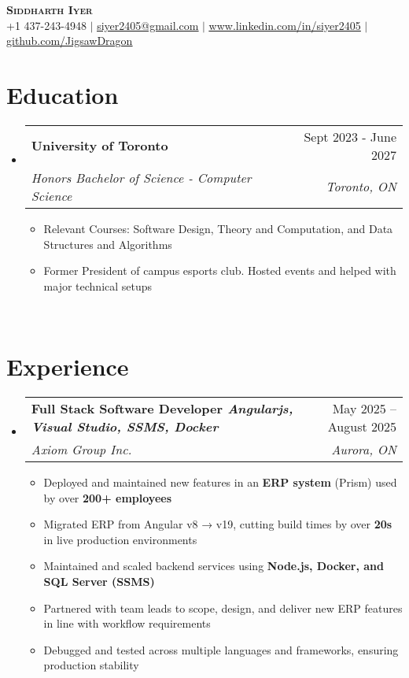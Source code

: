 \documentclass[letterpaper,11pt]{article}
\makeatletter
\newcommand{\resumeItem}[1]{
  \item\small{
    {#1 \vspace{-2pt}}
  }
}
\newcommand{\resumeSubheading}[4]{
  \vspace{-2pt}\item
    \begin{tabular*}{0.97\textwidth}[t]{l@{\extracolsep{\fill}}r}
      \textbf{#1} & #2 \\
      \textit{\small#3} & \textit{\small #4} \\
    \end{tabular*}\vspace{-7pt}
}
\newcommand{\resumeSubHeadingListStart}{\begin{itemize}[leftmargin=0.15in, label={}]}
\newcommand{\resumeSubHeadingListEnd}{\end{itemize}}
\newcommand{\resumeItemListStart}{\begin{itemize}}
\newcommand{\resumeItemListEnd}{\end{itemize}\vspace{-5pt}}
\makeatother
\begin{document}

\begin{center}
    \textbf{\Huge \scshape Siddharth Iyer} \\ \vspace{1pt}
    \small +1 437-243-4948 $|$ \href{mailto:x@x.com}{\underline{siyer2405@gmail.com}} $|$ 
    \href{https://linkedin.com/in/...}{\underline{www.linkedin.com/in/siyer2405}} $|$
    \href{https://github.com/...}{\underline{github.com/JigsawDragon}}
\end{center}


\section{Education}
  \resumeSubHeadingListStart
    \resumeSubheading
      {University of Toronto}{Sept 2023 - June 2027}
      {Honors Bachelor of Science -  Computer Science}{Toronto, ON}
    \resumeItemListStart
        \resumeItem{Relevant Courses: Software Design, Theory and Computation, and Data Structures and Algorithms}
        \resumeItem{Former President of campus esports club. Hosted events and helped with major technical setups}
    \resumeItemListEnd
    \resumeSubHeadingListEnd
\
\section{Experience}
\resumeSubHeadingListStart
    \resumeSubheading
      {Full Stack Software Developer \textnormal{\emph{Angularjs, Visual Studio, SSMS, Docker}}}{ May 2025 -- August 2025}
      {Axiom Group Inc.}{Aurora, ON}
      \resumeItemListStart
      \resumeItem{Deployed and maintained new features in an \textbf{ERP system} (Prism) used by over \textbf{200+ employees}}
      \resumeItem{Migrated ERP from Angular v8 → v19, cutting build times by over \textbf{20s} in live production environments}
      \resumeItem{Maintained and scaled backend services using \textbf{Node.js, Docker, and SQL Server (SSMS)}}
      \resumeItem{Partnered with team leads to scope, design, and deliver new ERP features in line with workflow requirements}
      \resumeItem{Debugged and tested across multiple languages and frameworks, ensuring production stability}
      \resumeItemListEnd
  \resumeSubHeadingListEnd
    
\end{document}
